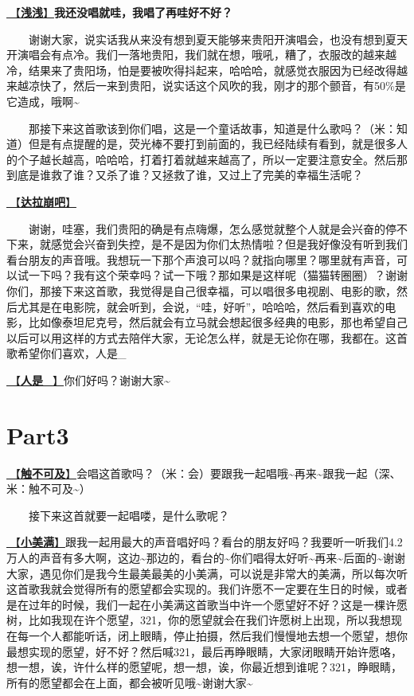 \documentclass[]{ctexbook}
\begin{document}
\hyperref[qianqian]{🎵【\textbf{浅浅}】}\textbf{我还没唱就哇，我唱了再哇好不好？}

  谢谢大家，说实话我从来没有想到夏天能够来贵阳开演唱会，也没有想到夏天开演唱会有点冷。我们一落地贵阳，我们就在想，哦吼，糟了，衣服改的越来越冷，结果来了贵阳场，怕是要被吹得抖起来，哈哈哈，就感觉衣服因为已经改得越来越凉快了，然后一来到贵阳，说实话这个风吹的我，刚才的那个颤音，有50\%是它造成，哦啊\textasciitilde{}

  那接下来这首歌该到你们唱，这是一个童话故事，知道是什么歌吗？（米：知道）但是有点提醒的是，荧光棒不要打到前面的，我已经陆续有看到，就是很多人的个子越长越高，哈哈哈，打着打着就越来越高了，所以一定要注意安全。然后那到底是谁救了谁？又杀了谁？又拯救了谁，又过上了完美的幸福生活呢？

\hyperref[dalabengba]{🎵【\textbf{达拉崩吧}】}

  谢谢，哇塞，我们贵阳的确是有点嗨爆，怎么感觉就整个人就是会兴奋的停不下来，就感觉会兴奋到失控，是不是因为你们太热情啦？但是我好像没有听到我们看台朋友的声音哦。我想玩一下那个声浪可以吗？就指向哪里？哪里就有声音，可以试一下吗？我有这个荣幸吗？试一下哦？那如果是这样呢（猫猫转圈圈）？谢谢你们，那接下来这首歌，我觉得是自己很幸福，可以唱很多电视剧、电影的歌，然后尤其是在电影院，就会听到，会说，``哇，好听''，哈哈哈，然后看到喜欢的电影，比如像泰坦尼克号，然后就会有立马就会想起很多经典的电影，那也希望自己以后可以用这样的方式去陪伴大家，无论怎么样，就是无论你在哪，我都在。这首歌希望你们喜欢，人是\_

\hyperref[renshi]{🎵【\textbf{人是\_}】}你们好吗？谢谢大家\textasciitilde{}

\section{Part3}\label{guiyang-20240713-part3}

\hyperref[untouchable]{🎵【\textbf{触不可及}】}会唱这首歌吗？（米：会）要跟我一起唱哦\textasciitilde 再来\textasciitilde 跟我一起（深、米：触不可及\textasciitilde）

  接下来这首就要一起唱喽，是什么歌呢？

\hyperref[happy-ending]{🎵【\textbf{小美满}】}跟我一起用最大的声音唱好吗？看台的朋友好吗？我要听一听我们4.2万人的声音有多大啊，这边\textasciitilde 那边的，看台的\textasciitilde 你们唱得太好听\textasciitilde 再来\textasciitilde 后面的\textasciitilde 谢谢大家，遇见你们是我今生最美最美的小美满，可以说是非常大的美满，所以每次听这首歌我就会觉得所有的愿望都会实现的。我们许愿不一定要在生日的时候，或者是在过年的时候，我们一起在小美满这首歌当中许一个愿望好不好？这是一棵许愿树，比如我现在许个愿望，321，你的愿望就会在我们许愿树上出现，所以我想现在每一个人都能听话，闭上眼睛，停止拍摄，然后我们慢慢地去想一个愿望，想你最想实现的愿望，好不好？然后喊321，最后再睁眼睛，大家闭眼睛开始许愿咯，想一想，诶，许什么样的愿望呢，想一想，诶，你最近想到谁呢？321，睁眼睛，所有的愿望都会在上面，都会被听见哦\textasciitilde 谢谢大家\textasciitilde{}
\end{document}
